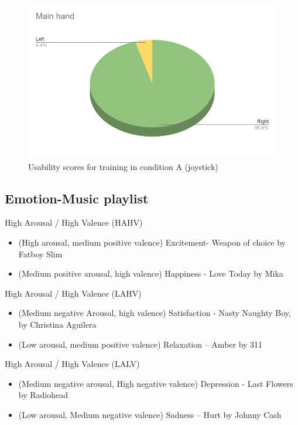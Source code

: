 \begin{figure}[!htb]
\includegraphics[width=14cm]{img/appendix/right_hand.png}
\centering
\caption{Usability scores for training in condition A (joystick)}\label{fig:usbility_condition_B}
\end{figure}

\subsection{Emotion-Music playlist}
\label{sec:appendix_A2.2}

High Arousal / High Valence (HAHV)
\begin{itemize}
\item  (High arousal, medium positive valence) Excitement- Weapon of choice by Fatboy Slim
\item  (Medium positive arousal, high valence) Happiness - Love Today by Mika
\end{itemize}

High Arousal / High Valence (LAHV)
\begin{itemize}
\item  (Medium negative Arousal, high valence) Satisfaction - Nasty Naughty Boy, by Christina Aguilera
\item 	 (Low arousal, medium positive valence) Relaxation – Amber by 311
\end{itemize}

High Arousal / High Valence (LALV)
\begin{itemize}
\item  (Medium negative arousal, High negative valence) Depression - Last Flowers by Radiohead
\item  (Low arousal, Medium negative valence) Sadness – Hurt by Johnny Cash
\end{itemize}

